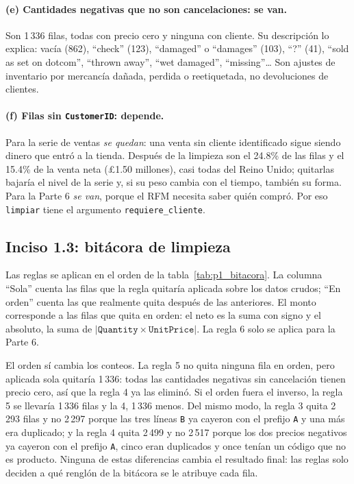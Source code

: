 \paragraph{(e) Cantidades negativas que no son cancelaciones: se van.} Son
1\,336 filas, todas con precio cero y ninguna con cliente. Su descripción lo
explica: vacía (862), ``check'' (123), ``damaged'' o ``damages'' (103),
``?'' (41), ``sold as set on dotcom'', ``thrown away'', ``wet damaged'',
``missing''\dots{} Son ajustes de inventario por mercancía dañada, perdida o
reetiquetada, no devoluciones de clientes.

\paragraph{(f) Filas sin \texttt{CustomerID}: depende.} Para la serie de
ventas \emph{se quedan}: una venta sin cliente identificado sigue siendo
dinero que entró a la tienda. Después de la limpieza son el 24.8\% de las
filas y el 15.4\% de la venta neta (\pounds1.50 millones), casi todas del
Reino Unido; quitarlas bajaría el nivel de la serie y, si su peso cambia con
el tiempo, también su forma. Para la Parte 6 \emph{se van}, porque el RFM
necesita saber quién compró. Por eso \texttt{limpiar} tiene el argumento
\texttt{requiere\_cliente}.

\subsection{Inciso 1.3: bitácora de limpieza}

Las reglas se aplican en el orden de la tabla~\ref{tab:p1_bitacora}. La
columna ``Sola'' cuenta las filas que la regla quitaría aplicada sobre los
datos crudos; ``En orden'' cuenta las que realmente quita después de las
anteriores. El monto corresponde a las filas que quita en orden: el neto es la
suma con signo y el absoluto, la suma de $|\texttt{Quantity}\times
\texttt{UnitPrice}|$. La regla 6 solo se aplica para la Parte 6.

\begin{table}[H]
  \centering
  \small
  \caption{Bitácora de limpieza, en el orden en que se aplican las reglas.}
  \label{tab:p1_bitacora}
\end{table}

El orden sí cambia los conteos. La regla 5 no quita ninguna fila en orden,
pero aplicada sola quitaría 1\,336: todas las cantidades negativas sin
cancelación tienen precio cero, así que la regla 4 ya las eliminó. Si el orden
fuera el inverso, la regla 5 se llevaría 1\,336 filas y la 4, 1\,336 menos.
Del mismo modo, la regla 3 quita 2\,293 filas y no 2\,297 porque las tres
líneas \texttt{B} ya cayeron con el prefijo \texttt{A} y una más era
duplicado; y la regla 4 quita 2\,499 y no 2\,517 porque los dos precios
negativos ya cayeron con el prefijo \texttt{A}, cinco eran duplicados y once
tenían un código que no es producto.
Ninguna de estas diferencias cambia el resultado final: las reglas solo
deciden a qué renglón de la bitácora se le atribuye cada fila.

